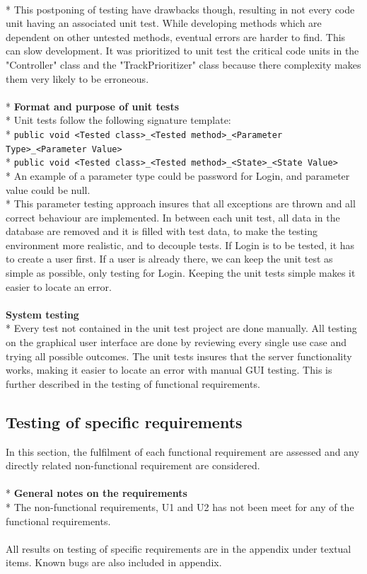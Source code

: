 \documentclass[a4paper,11pt,report]{article}
\begin{document}
\\*
This postponing of testing have drawbacks though, resulting in not every code unit having an associated unit test. While developing methods which are dependent on other untested methods, eventual errors are harder to find. This can slow development. It was prioritized to unit test the
critical code units in the "Controller" class and the "TrackPrioritizer" class because there complexity makes them very likely to be erroneous.\\ \\*
\textbf{Format and purpose of unit tests}\\*
Unit tests follow the following signature template:
\\*
\verb|public void <Tested class>_<Tested method>_<Parameter Type>_<Parameter Value>|
\\*
\verb|public void <Tested class>_<Tested method>_<State>_<State Value>|
\\*
An example of a parameter type could be password for Login, and parameter value could be null. \\*
This parameter testing approach insures that all exceptions are thrown and all correct behaviour are implemented. In between each unit test, all data in the database are removed and it is filled with test data, to make the testing environment more realistic, and to decouple tests. If Login is to be tested, it has to create a user first. If a user is already there, we can keep the unit test as simple as possible, only testing for Login. Keeping the unit tests simple makes it easier to locate an error. \\ \\
\textbf{System testing}\\*
Every test not contained in the unit test project are done manually. All testing on the graphical user interface are done by reviewing every single use case and trying all possible outcomes. The unit tests insures that the server functionality works, making it easier to locate an error with manual GUI testing. This is further described in the testing of functional requirements.

\subsection{Testing of specific requirements}
In this section, the fulfilment of each functional requirement are assessed and any directly related non-functional requirement are considered. \\ \\*
\textbf{General notes on the requirements} \\*
The non-functional requirements, U1 and U2 has not been meet for any of the functional requirements. \\ \\
All results on testing of specific requirements are in the appendix under textual items. Known bugs are also included in appendix.
\end{document}
